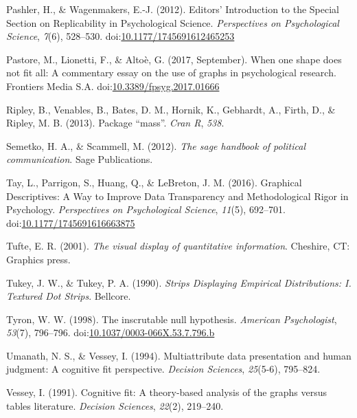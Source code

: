 \documentclass[
  doc]{apa6}
\begin{document}
\leavevmode\hypertarget{ref-Pashler2012a}{}%
Pashler, H., \& Wagenmakers, E.-J. (2012). Editors' Introduction to the Special Section on Replicability in Psychological Science. \emph{Perspectives on Psychological Science}, \emph{7}(6), 528--530. doi:\href{https://doi.org/10.1177/1745691612465253}{10.1177/1745691612465253}

\leavevmode\hypertarget{ref-Pastore2017}{}%
Pastore, M., Lionetti, F., \& Altoè, G. (2017, September). When one shape does not fit all: A commentary essay on the use of graphs in psychological research. Frontiers Media S.A. doi:\href{https://doi.org/10.3389/fpsyg.2017.01666}{10.3389/fpsyg.2017.01666}

\leavevmode\hypertarget{ref-ripley2013package}{}%
Ripley, B., Venables, B., Bates, D. M., Hornik, K., Gebhardt, A., Firth, D., \& Ripley, M. B. (2013). Package ``mass''. \emph{Cran R}, \emph{538}.

\leavevmode\hypertarget{ref-semetko2012sage}{}%
Semetko, H. A., \& Scammell, M. (2012). \emph{The sage handbook of political communication}. Sage Publications.

\leavevmode\hypertarget{ref-Tay2016a}{}%
Tay, L., Parrigon, S., Huang, Q., \& LeBreton, J. M. (2016). Graphical Descriptives: A Way to Improve Data Transparency and Methodological Rigor in Psychology. \emph{Perspectives on Psychological Science}, \emph{11}(5), 692--701. doi:\href{https://doi.org/10.1177/1745691616663875}{10.1177/1745691616663875}

\leavevmode\hypertarget{ref-Tufte2001}{}%
Tufte, E. R. (2001). \emph{The visual display of quantitative information}. Cheshire, CT: Graphics press.

\leavevmode\hypertarget{ref-Tukey1990}{}%
Tukey, J. W., \& Tukey, P. A. (1990). \emph{Strips Displaying Empirical Distributions: I. Textured Dot Strips}. Bellcore.

\leavevmode\hypertarget{ref-Tyron1998}{}%
Tyron, W. W. (1998). The inscrutable null hypothesis. \emph{American Psychologist}, \emph{53}(7), 796--796. doi:\href{https://doi.org/10.1037/0003-066X.53.7.796.b}{10.1037/0003-066X.53.7.796.b}

\leavevmode\hypertarget{ref-umanath1994multiattribute}{}%
Umanath, N. S., \& Vessey, I. (1994). Multiattribute data presentation and human judgment: A cognitive fit perspective. \emph{Decision Sciences}, \emph{25}(5-6), 795--824.

\leavevmode\hypertarget{ref-vessey1991cognitive}{}%
Vessey, I. (1991). Cognitive fit: A theory-based analysis of the graphs versus tables literature. \emph{Decision Sciences}, \emph{22}(2), 219--240.
\end{document}
